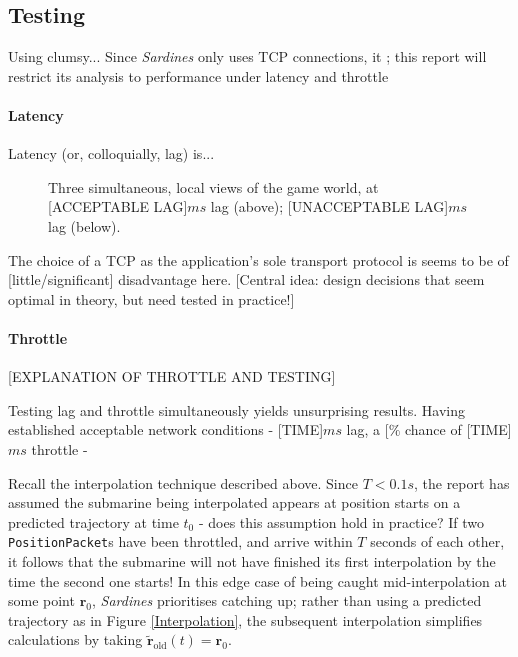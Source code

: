 \documentclass[a4paper, 9pt]{article}
\begin{document}
\begin{flushleft}
\pagebreak
\subsection*{Testing}

\vspace{5pt}
Using clumsy...
Since \textit{Sardines} only uses TCP connections, it ; this report will restrict its analysis to performance under latency and throttle

\paragraph{Latency} Latency (or, colloquially, lag) is...

\begin{figure}[h]
\centering
\caption{Three simultaneous, local views of the game world, at [ACCEPTABLE LAG]$ms$ lag (above); [UNACCEPTABLE LAG]$ms$ lag (below).}
\label{Lag Testing}
\end{figure}

\vspace{5pt} The choice of a TCP as the application's sole transport protocol is seems to be of [little/significant] disadvantage here. [Central idea: design decisions that seem optimal in theory, but need tested in practice!]

\paragraph{Throttle} [EXPLANATION OF THROTTLE AND TESTING]

\vspace{5pt}\noindent
Testing lag and throttle simultaneously yields unsurprising results. Having established acceptable network conditions - [TIME]$ms$ lag, a [$\%$ chance of [TIME]$ms$ throttle -

\vspace{5pt}\noindent
Recall the interpolation technique described above. Since $T < 0.1s$, the report has assumed the submarine being interpolated appears at position starts on a predicted trajectory at time $t_0$ - does this assumption hold in practice? If two \texttt{PositionPacket}s have been throttled, and arrive within $T$ seconds of each other, it follows that the submarine will not have finished its first interpolation by the time the second one starts! In this edge case of being caught mid-interpolation at some point $\mathbf{r}_0$, \textit{Sardines} prioritises catching up; rather than using a predicted trajectory as in Figure \ref{Interpolation}, the subsequent interpolation simplifies calculations by taking $\mathbf{\tilde{r}}_{\textrm{old}}(t) = \mathbf{r}_0$.


\end{flushleft}
\end{document}
